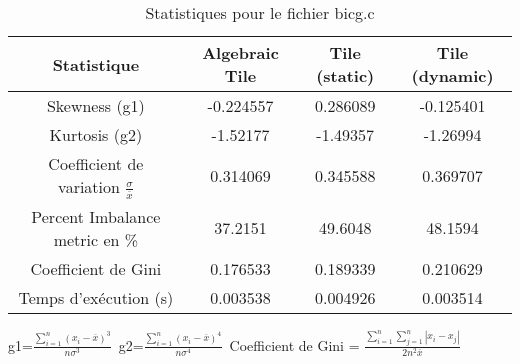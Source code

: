 \documentclass{article}
\begin{document}
\begin{table}[htbp]
  \centering
  \caption{Statistiques pour le fichier bicg.c}
  \begin{tabular}{|c|c|c|c|}
    \hline
    Statistique & Algebraic Tile & Tile (static) & Tile (dynamic) \\ 
    \hline
    Skewness (g1)  & -0.224557 & 0.286089 & -0.125401 \\ 
    Kurtosis (g2)  & -1.52177 & -1.49357 & -1.26994 \\ 
    Coefficient de variation $ \frac{\sigma}{\overline{x}} $ & 0.314069 & 0.345588 & 0.369707\\ 
    Percent Imbalance metric en \% & 37.2151 & 49.6048 & 48.1594\\ 
    Coefficient de Gini  & 0.176533 & 0.189339 & 0.210629\\ 
    Temps d'exécution (s) &  0.003538    &  0.004926   &  0.003514   \\ 

    \hline
  \end{tabular}
\end{table}
g1=$ \frac{\sum_{i=1}^{n} (x_i - \overline{x})^3}{n\sigma^3} $\
g2=$ \frac{\sum_{i=1}^{n} (x_i - \overline{x})^4}{n\sigma^4} $\
Coefficient de Gini = $ \frac{\sum_{i=1}^{n}\sum_{j=1}^{n} |x_i - x_j|}{2n^2\overline{x}} $\
\newpage
\end{document}
